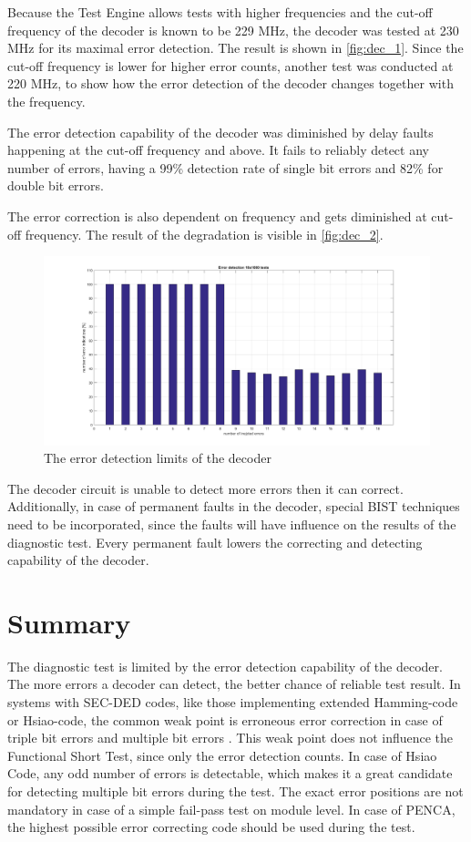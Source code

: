 Because the Test Engine allows tests with higher frequencies and the cut-off frequency of the decoder is known to be 229 MHz, the decoder was tested at 230 MHz for its maximal error detection. The result is shown in \autoref{fig:dec_1}. Since the cut-off frequency is lower for higher error counts, another test was conducted at 220 MHz, to show how the error detection of the decoder changes together with the frequency.

The error detection capability of the decoder was diminished by delay faults happening at the cut-off frequency and above. It fails to reliably detect any number of errors, having a 99\% detection rate of single bit errors and 82\% for double bit errors.

The error correction is also dependent on frequency and gets diminished at cut-off frequency. The result of the degradation is visible in \autoref{fig:dec_2}.

\begin{figure}[h]
\centering
\includegraphics[width=\textwidth]{figures/1000_tests_error_detection.png}
\caption{The error detection limits of the decoder}
\label{fig:dec_1}
\end{figure}


The decoder circuit is unable to detect more errors then it can correct. Additionally, in case of permanent faults in the decoder, special BIST techniques need to be incorporated, since the faults will have influence on the results of the diagnostic test. Every permanent fault lowers the correcting and detecting capability of the decoder.

\chapter{Summary}

The diagnostic test is limited by the error detection capability of the decoder. The more errors a decoder can detect, the better chance of reliable test result. In systems with SEC-DED codes, like those implementing extended Hamming-code or Hsiao-code, the common weak point is erroneous error correction in case of triple bit errors and multiple bit errors \cite{art:Dicorato}. This weak point does not influence the Functional Short Test, since only the error detection counts. In case of Hsiao Code, any odd number of errors is detectable, which makes it a great candidate for detecting multiple bit errors during the test. The exact error positions are not mandatory in case of a simple fail-pass test on module level. In case of PENCA, the highest possible error correcting code should be used during the test.

